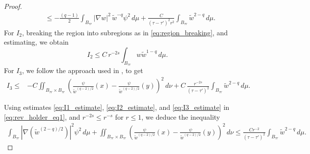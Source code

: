 \documentclass[11pt]{article}
\begin{document}
\begin{proof}
\begin{equation}
\begin{aligned}
&\leq -\frac{(q - 1)}{2} \int_{B_{\tau r}} |\nabla w|^2 \, \widetilde{w}^{-q} \psi^2 \, d\mu 
+ \frac{C}{(\tau - \tau')^2 r^2} \int_{B_{\tau r}} \widetilde{w}^{2 - q} \, d\mu.
\end{aligned}
\label{eq:I1_estimate}
\end{equation}
For \( I_2 \), breaking the region into subregions as in \eqref{eq:region_breaking}, and estimating, we obtain
\begin{equation}
    I_2 \leq C \, r^{-2s} \int_{B_{\tau r}} w \widetilde{w}^{1 - q} \, d\mu.
    \label{eq:I2_estimate}
\end{equation}
For \( I_3 \), we follow the approach used in \cite[Lemma $3.7$]{peral2016CZ}, to get
\begin{equation}
\begin{aligned}
    I_3 \leq & -C \iint_{B_{\tau r} \times B_{\tau r}} 
    \left( \frac{\psi}{\widetilde{w}^{(q - 2)/2}}(x) - \frac{\psi}{\widetilde{w}^{(q - 2)/2}}(y) \right)^2 \, d\nu + C \, \frac{r^{-2s}}{(\tau - \tau')^2} \int_{B_{\tau r}} \widetilde{w}^{2 - q} \, d\mu.
\end{aligned}
\label{eq:I3_estimate}
\end{equation}


Using estimates \eqref{eq:I1_estimate}, \eqref{eq:I2_estimate}, and \eqref{eq:I3_estimate} in \eqref{eq:rev_holder_eq1}, and $r^{-2s} \leq r^{-s}$ for $r \leq 1$, we deduce the inequality
\small{\begin{equation*}
\begin{aligned}
    \int_{B_{\tau r}} \left| \nabla\left( \widetilde{w}^{(2 - q)/2} \right) \right|^2 \psi^2 \, d\mu + \iint_{B_{\tau r} \times B_{\tau r}} 
    \left( \frac{\psi}{\widetilde{w}^{(q - 2)/2}}(x) - \frac{\psi}{\widetilde{w}^{(q - 2)/2}}(y) \right)^2 \, d\nu \leq \frac{C r^{-2}}{(\tau - \tau')^2} \int_{B_{\tau r}} \widetilde{w}^{2 - q} \, d\mu.
\end{aligned}
\end{equation*}}



\end{proof}
\end{document}
